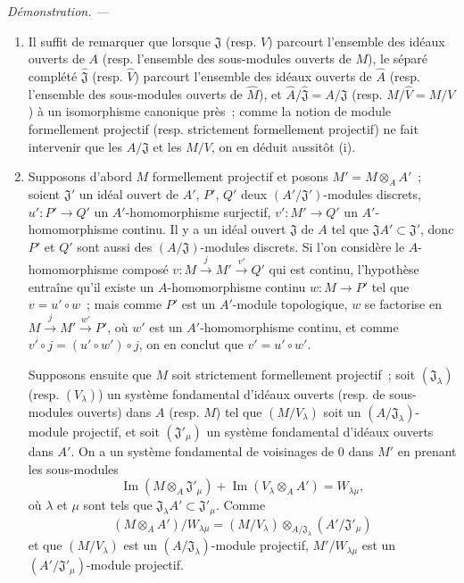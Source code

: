 \documentclass[10pt,oneside]{book}
\newenvironment{proof}{%
  \par\medskip\noindent\textit{Démonstration. ---\ }}{\par}
\begin{document}
\begin{proof}
\begin{enumerate}
  \item[(i)] Il suffit de remarquer que lorsque $\mathfrak J$ (resp. $V$)
  parcourt l'ensemble des idéaux ouverts de $A$ (resp. l'ensemble des
  sous-modules ouverts de $M$), le séparé complété $\hat{\mathfrak J}$
  (resp. $\hat V$) parcourt l'ensemble des idéaux ouverts de $\hat A$
  (resp. l'ensemble des sous-modules ouverts de $\hat M$), et
  $\hat A/\hat{\mathfrak J}=A/\mathfrak J$ (resp.
  $\hat M/\hat V=M/V$) à un isomorphisme canonique près~; comme la notion
  de module formellement projectif (resp. strictement formellement projectif)
  ne fait intervenir que les $A/\mathfrak J$ et les $M/V$, on en déduit
  aussitôt (i).
  \item[(ii)] Supposons d'abord $M$ formellement projectif et posons
  $M'=M\otimes_A A'$~; soient $\mathfrak J'$ un idéal ouvert de $A'$, $P'$,
  $Q'$ deux $(A'/\mathfrak J')$-modules discrets, $u':P'\to Q'$ un
  $A'$-homomorphisme surjectif, $v':M'\to Q'$ un $A'$-homomorphisme continu.
  Il y a un idéal ouvert $\mathfrak J$ de $A$ tel que
  $\mathfrak JA'\subset\mathfrak J'$, donc $P'$ et $Q'$ sont aussi des
  $(A/\mathfrak J)$-modules discrets. Si l'on considère le
  $A$-homomorphisme composé $v:M\xrightarrow{j}M'\xrightarrow{v'}Q'$ qui est
  continu, l'hypothèse entraîne qu'il existe un $A$-homomorphisme continu
  $w:M\to P'$ tel que $v=u'\circ w$~; mais comme $P'$ est un $A'$-module
  topologique, $w$ se factorise en
  $M\xrightarrow{j}M'\xrightarrow{w'}P'$, où $w'$ est un $A'$-homomorphisme
  continu, et comme $v'\circ j=(u'\circ w')\circ j$, on en conclut que
  $v'=u'\circ w'$.

  Supposons ensuite que $M$ soit strictement formellement projectif~; soit
  $(\mathfrak J_\lambda)$ (resp. $(V_\lambda)$) un système fondamental
  d'idéaux ouverts (resp. de sous-modules ouverts) dans $A$ (resp. $M$) tel
  que $(M/V_\lambda)$ soit un $(A/\mathfrak J_\lambda)$-module projectif,
  et soit $(\mathfrak J'_\mu)$ un système fondamental d'idéaux ouverts dans
  $A'$. On a un système fondamental de voisinages de $0$ dans $M'$ en prenant
  les sous-modules
  \[
    \operatorname{Im}(M\otimes_A\mathfrak J'_\mu)
    +\operatorname{Im}(V_\lambda\otimes_A A')=W_{\lambda\mu},
  \]
  où $\lambda$ et $\mu$ sont tels que
  $\mathfrak J_\lambda A'\subset\mathfrak J'_\mu$. Comme
  \[
    (M\otimes_A A')/W_{\lambda\mu}
    =(M/V_\lambda)\otimes_{A/\mathfrak J_\lambda}
      (A'/\mathfrak J'_\mu)
  \]
  et que $(M/V_\lambda)$ est un
  $(A/\mathfrak J_\lambda)$-module projectif, $M'/W_{\lambda\mu}$
  est un $(A'/\mathfrak J'_\mu)$-module projectif.
\end{enumerate}
\end{proof}
\end{document}
